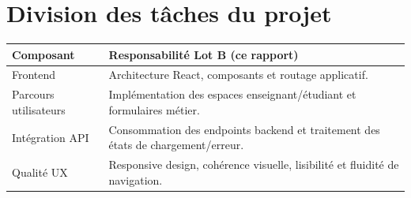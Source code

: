 \section{Division des tâches du projet}
\begin{tabularx}{\textwidth}{lX}
\toprule
\textbf{Composant} & \textbf{Responsabilité Lot B (ce rapport)} \\
\midrule
Frontend & Architecture React, composants et routage applicatif. \\
Parcours utilisateurs & Implémentation des espaces enseignant/étudiant et formulaires métier. \\
Intégration API & Consommation des endpoints backend et traitement des états de chargement/erreur. \\
Qualité UX & Responsive design, cohérence visuelle, lisibilité et fluidité de navigation. \\
\bottomrule
\end{tabularx}
